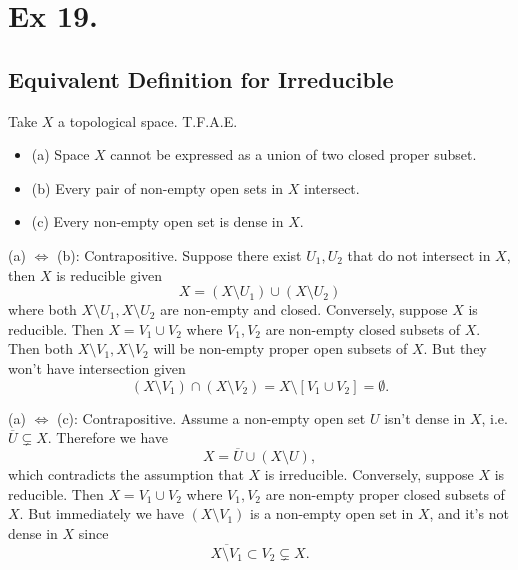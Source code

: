 \section{Ex 19.}\label{Atiyah Chapter 1 Ex 19.}

\subsection{Equivalent Definition for Irreducible}

Take $X$ a topological space. T.F.A.E. 
\begin{itemize}
    \item (a) Space $X$ cannot be expressed as a union of two closed proper subset.
    \item (b) Every pair of non-empty open sets in $X$ intersect.
    \item (c) Every non-empty open set is dense in $X$.
\end{itemize}

(a) $\Leftrightarrow$ (b): Contrapositive. Suppose there exist $U_1,U_2$ that do not intersect in $X$, then $X$ is reducible given $$X=(X\setminus U_1)\cup(X\setminus U_2)$$ where both $X\setminus U_1,X\setminus U_2$ are non-empty and closed. 
Conversely, suppose $X$ is reducible. Then $X=V_1\cup V_2$ where $V_1,V_2$ are non-empty closed subsets of $X$. Then both $X\setminus V_1,X\setminus V_2$ will be non-empty proper open subsets of $X$. But they won't have intersection given 
$$(X\setminus V_1)\cap(X\setminus V_2)=X\setminus [V_1\cup V_2]=\emptyset.$$

(a) $\Leftrightarrow$ (c): Contrapositive. Assume a non-empty open set $U$ isn't dense in $X$, i.e. $\overline{U}\subsetneq X$. Therefore we have $$X=\overline{U}\cup (X\setminus U),$$ which contradicts the assumption that $X$ is irreducible. Conversely, suppose $X$ is reducible. Then $X=V_1\cup V_2$ where $V_1,V_2$ are non-empty proper closed subsets of $X$. But immediately we have $(X\setminus V_1)$ is a non-empty open set in $X$, and it's not dense in $X$ since 
$$\overline{X\setminus V_1}\subset V_2\subsetneq X.$$

\subsection{}

